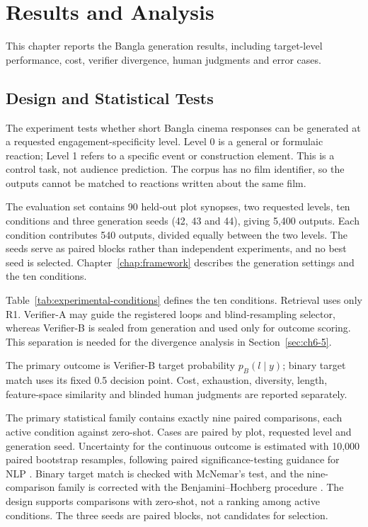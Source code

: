 
\chapter{Results and Analysis}
\label{chap:experimental-results}

\ifpdf
    \graphicspath{{Chapter6/Figs/Raster/}{Chapter6/Figs/PDF/}{Chapter6/Figs/}}
\else
    \graphicspath{{Chapter6/Figs/Vector/}{Chapter6/Figs/}}
\fi

This chapter reports the Bangla generation results, including target-level performance, cost, verifier divergence, human judgments and error cases.

\section{Design and Statistical Tests}
\label{sec:ch6-1}

The experiment tests whether short Bangla cinema responses can be generated at a requested engagement-specificity level. Level 0 is a general or formulaic reaction; Level 1 refers to a specific event or construction element. This is a control task, not audience prediction. The corpus has no film identifier, so the outputs cannot be matched to reactions written about the same film.

The evaluation set contains 90 held-out plot synopses, two requested levels, ten conditions and three generation seeds (42, 43 and 44), giving 5,400 outputs. Each condition contributes 540 outputs, divided equally between the two levels. The seeds serve as paired blocks rather than independent experiments, and no best seed is selected. Chapter~\ref{chap:framework} describes the generation settings and the ten conditions.

Table~\ref{tab:experimental-conditions} defines the ten conditions. Retrieval uses only R1. Verifier-A may guide the registered loops and blind-resampling selector, whereas Verifier-B is sealed from generation and used only for outcome scoring. This separation is needed for the divergence analysis in Section~\ref{sec:ch6-5}.

The primary outcome is Verifier-B target probability $p_B(l \mid y)$; binary target match uses its fixed 0.5 decision point. Cost, exhaustion, diversity, length, feature-space similarity and blinded human judgments are reported separately.

The primary statistical family contains exactly nine paired comparisons, each active condition against zero-shot. Cases are paired by plot, requested level and generation seed. Uncertainty for the continuous outcome is estimated with 10,000 paired bootstrap resamples, following paired significance-testing guidance for NLP \cite{b49}. Binary target match is checked with McNemar's test, and the nine-comparison family is corrected with the Benjamini--Hochberg procedure \cite{b50}. The design supports comparisons with zero-shot, not a ranking among active conditions. The three seeds are paired blocks, not candidates for selection.


